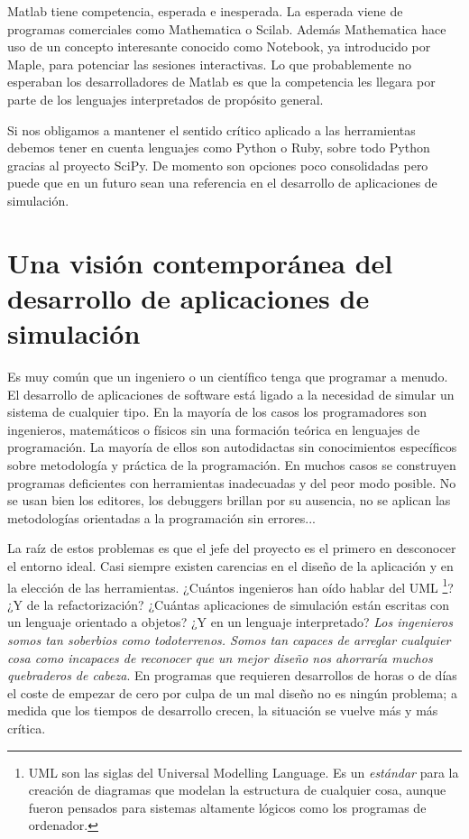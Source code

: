 Matlab tiene competencia, esperada e inesperada. La esperada viene de
programas comerciales como Mathematica o Scilab. Además Mathematica hace uso de 
un concepto interesante conocido como Notebook, ya
introducido por Maple, para potenciar las sesiones interactivas. Lo
que probablemente no esperaban los desarrolladores de Matlab es que la
competencia les llegara por parte de los lenguajes interpretados de
propósito general.

Si nos obligamos a mantener el sentido crítico aplicado a las
herramientas debemos tener en cuenta lenguajes como Python o Ruby,
sobre todo Python gracias al proyecto SciPy. De momento son opciones
poco consolidadas pero puede que en un futuro sean una referencia en
el desarrollo de aplicaciones de simulación.

\section{Una visión contemporánea del desarrollo de aplicaciones de
simulación}

Es muy común que un ingeniero o un científico tenga que programar a
menudo. El desarrollo de aplicaciones de software está ligado a la
necesidad de simular un sistema de cualquier tipo. En la mayoría de
los casos los programadores son ingenieros, matemáticos o físicos sin
una formación teórica en lenguajes de programación. La mayoría de
ellos son autodidactas sin conocimientos específicos sobre metodología
y práctica de la programación. En muchos casos se construyen programas
deficientes con herramientas inadecuadas y del peor modo posible.  No
se usan bien los editores, los debuggers brillan por su ausencia, no
se aplican las metodologías orientadas a la programación sin errores...

La raíz de estos problemas es que el jefe del proyecto es el primero
en desconocer el entorno ideal. Casi siempre existen carencias en el
diseño de la aplicación y en la elección de las herramientas. ¿Cuántos
ingenieros han oído hablar del UML%
\footnote{UML son las siglas del Universal Modelling Language. Es un
  \emph{estándar} para la creación de diagramas que modelan la
  estructura de cualquier cosa, aunque fueron pensados para sistemas
  altamente lógicos como los programas de ordenador.%
}? ¿Y de la refactorización? ¿Cuántas aplicaciones de simulación están
escritas con un lenguaje orientado a objetos? ¿Y en un lenguaje
interpretado?  \emph{Los ingenieros somos tan soberbios como
  todoterrenos. Somos tan capaces de arreglar cualquier cosa como
  incapaces de reconocer que un mejor diseño nos ahorraría muchos
  quebraderos de cabeza}. En programas que requieren desarrollos de
horas o de días el coste de empezar de cero por culpa de un mal diseño
no es ningún problema; a medida que los tiempos de desarrollo crecen, la
situación se vuelve más y más crítica.


